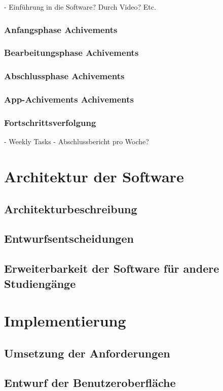 \documentclass{scrreprt}
\begin{document}
- Einführung in die Software? Durch Video? Etc.
\subsection{Anfangsphase Achivements}
\subsection{Bearbeitungsphase Achivements}
\subsection{Abschlussphase Achivements}
\subsection{App-Achivements Achivements}
\subsection{Fortschrittsverfolgung}
- Weekly Tasks
- Abschlussbericht pro Woche?

\chapter{Architektur der Software} \label{chap:architektur}
\section{Architekturbeschreibung}
\section{Entwurfsentscheidungen}
\section{Erweiterbarkeit der Software für andere Studiengänge}
\chapter{Implementierung} \label{chap:implementierung}
\section{Umsetzung der Anforderungen}
\section{Entwurf der Benutzeroberfläche}
\end{document}
